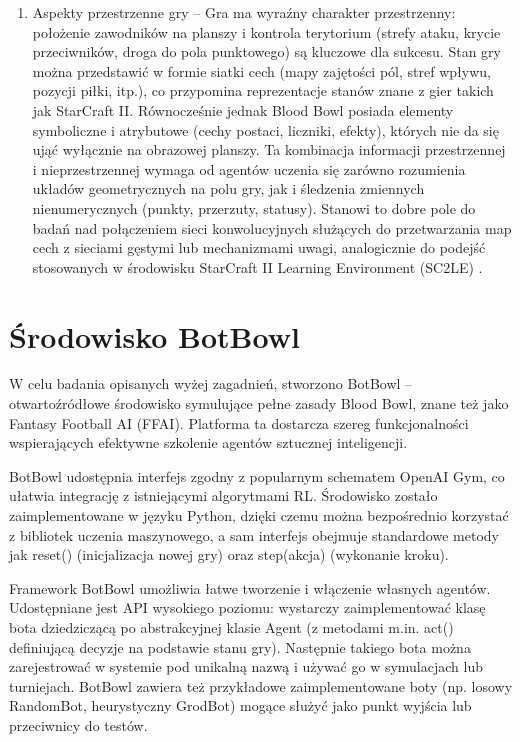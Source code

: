 \begin{enumerate}
	\item  Aspekty przestrzenne gry – Gra ma wyraźny charakter przestrzenny: położenie zawodników na planszy i kontrola terytorium (strefy ataku, krycie przeciwników, droga do pola punktowego) są kluczowe dla sukcesu. Stan gry można przedstawić w formie siatki cech (mapy zajętości pól, stref wpływu, pozycji piłki, itp.), co przypomina reprezentacje stanów znane z gier takich jak StarCraft II. Równocześnie jednak Blood Bowl posiada elementy symboliczne i atrybutowe (cechy postaci, liczniki, efekty), których nie da się ująć wyłącznie na obrazowej planszy. Ta kombinacja informacji przestrzennej i nieprzestrzennej wymaga od agentów uczenia się zarówno rozumienia układów geometrycznych na polu gry, jak i śledzenia zmiennych nienumerycznych (punkty, przerzuty, statusy). Stanowi to dobre pole do badań nad połączeniem sieci konwolucyjnych służących do przetwarzania map cech z sieciami gęstymi lub mechanizmami uwagi, analogicznie do podejść stosowanych w środowisku StarCraft II Learning Environment (SC2LE) \cite{Vinyals2017SC2LE}.
\end{enumerate}

\section{Środowisko BotBowl}
W celu badania opisanych wyżej zagadnień, stworzono BotBowl – otwartoźródłowe środowisko symulujące pełne zasady Blood Bowl, znane też jako Fantasy Football AI (FFAI). Platforma ta dostarcza szereg funkcjonalności wspierających efektywne szkolenie agentów sztucznej inteligencji.

BotBowl udostępnia interfejs zgodny z popularnym schematem OpenAI Gym, co ułatwia integrację z istniejącymi algorytmami RL. Środowisko zostało zaimplementowane w języku Python, dzięki czemu można bezpośrednio korzystać z bibliotek uczenia maszynowego, a sam interfejs obejmuje standardowe metody jak reset() (inicjalizacja nowej gry) oraz step(akcja) (wykonanie kroku).

Framework BotBowl umożliwia łatwe tworzenie i włączenie własnych agentów. Udostępniane jest API wysokiego poziomu: wystarczy zaimplementować klasę bota dziedziczącą po abstrakcyjnej klasie Agent (z metodami m.in. act() definiującą decyzje na podstawie stanu gry). Następnie takiego bota można zarejestrować w systemie pod unikalną nazwą i używać go w symulacjach lub turniejach. BotBowl zawiera też przykładowe zaimplementowane boty (np. losowy RandomBot, heurystyczny GrodBot) mogące służyć jako punkt wyjścia lub przeciwnicy do testów.

